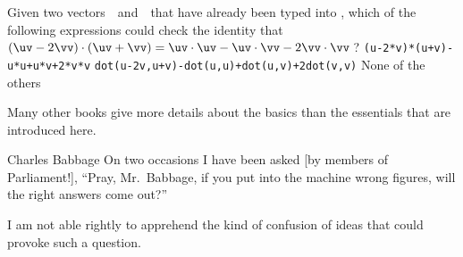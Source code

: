 \begin{activity}
Given two vectors~\uv\ and~\vv\ that have already been typed into \script,
which of the following expressions could check the identity that \((\uv-2\vv)\cdot(\uv+\vv)=\uv\cdot\uv-\uv\cdot\vv-2\vv\cdot\vv\)\,?
{\tt (u-2*v)*(u+v)-u*u+u*v+2*v*v}
{\tt dot(u-2v,u+v)-dot(u,u)+dot(u,v)+2dot(v,v)}
{None of the others}
\end{activity}




Many other books \cite[e.g.,][\S\S1.1--3]{Quarteroni2006} give more details about the basics than the essentials that are introduced here.




\begin{quoted}{Charles Babbage}%
On two occasions I have been asked [by members of 
Parliament!], ``Pray, Mr.~Babbage, if you put into the machine wrong figures, will the right answers come out?''

I am not able rightly to apprehend the kind of confusion of ideas that could provoke such a question.
\end{quoted}




\sectionExercises

